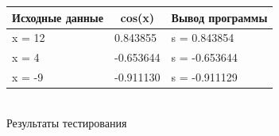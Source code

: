 \documentclass[a4paper,14pt]{extarticle}
\begin{document}

\begin{center}
\begin{tabular}{|l|l|l|}
\hline
\multicolumn{1}{|c|}{Исходные данные}&\multicolumn{1}{|c|}{cos(x)}& \multicolumn{1}{|c|}{Вывод программы}\\
\hline
x = 12 & 0.843855 & s = 0.843854\\
x = 4 & -0.653644 & s = -0.653644\\
x = -9 & -0.911130 & s = -0.911129\\
\hline
\end{tabular}\\
\vspace{0.3cm}
Результаты тестирования
\end{center}
\end{document}
